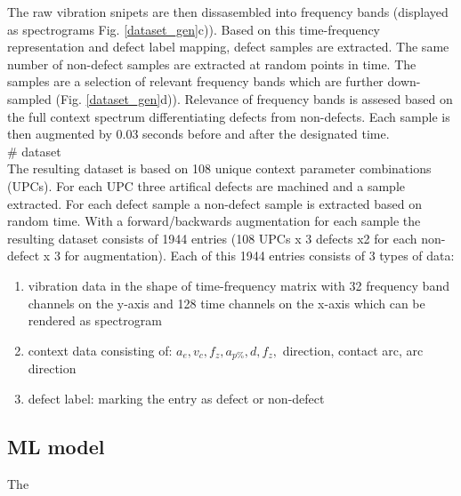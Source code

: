 \documentclass[5p,times,procedia]{elsarticle}
\begin{document}
The raw vibration snipets are then dissasembled into frequency bands (displayed as spectrograms Fig. \ref{dataset_gen}c)). Based on this time-frequency representation and defect label mapping, defect samples are extracted. The same number of non-defect samples are extracted at random points in time. The samples are a selection of relevant frequency bands which are further down-sampled (Fig. \ref{dataset_gen}d)). Relevance of frequency bands is assesed based on the full context spectrum differentiating defects from non-defects. Each sample is then augmented by 0.03 seconds before and after the designated time.\\

\# dataset\\
The resulting dataset is based on 108 unique context parameter combinations (UPCs). For each UPC three artifical defects are machined and a sample extracted. For each defect sample a non-defect sample is extracted based on random time.
With a forward/backwards augmentation for each sample the resulting dataset consists of 1944 entries (108 UPCs x 3 defects x2 for each non-defect x 3 for augmentation).
Each of this 1944 entries consists of 3 types of data:
\begin{enumerate}
	\item vibration data in the shape of time-frequency matrix with 32 frequency band channels on the y-axis and 128 time channels on the x-axis which can be rendered as spectrogram
	\item context data consisting of: $a_e, v_c, f_z, a_{p\%}, d, f_z,$ direction, contact arc, arc direction
	\item defect label: marking the entry as defect or non-defect
\end{enumerate}



\subsection{ML model}
\vspace*{-\baselineskip}
The 
\end{document}
